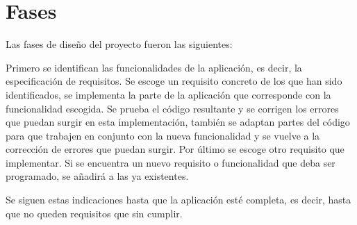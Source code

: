 %
%
%
%

\cleardoublepage
\chapter{Fases}
\label{chap:phases}

	Las fases de diseño del proyecto fueron las siguientes:
	

	\bigskip
	Primero se identifican las funcionalidades de la aplicación, es decir, la especificación de requisitos. Se escoge un requisito concreto de los que han sido identificados, se implementa la parte de la aplicación que corresponde con la funcionalidad escogida. Se prueba el código resultante y se corrigen los errores que puedan surgir en esta implementación, también se adaptan partes del código para que trabajen en conjunto con la nueva funcionalidad y se vuelve a la corrección de errores que puedan surgir. Por último se escoge otro requisito que implementar. Si se encuentra un nuevo requisito o funcionalidad que deba ser programado, se añadirá a las ya existentes.
	
	\bigskip
	Se siguen estas indicaciones hasta que la aplicación esté completa, es decir, hasta que no queden requisitos que sin cumplir.